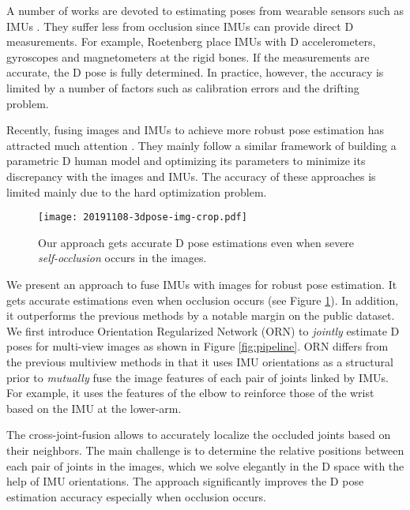 \documentclass[10pt,twocolumn,letterpaper]{article}
\begin{document}
A number of works are devoted to estimating poses from wearable sensors such as IMUs \cite{trumble2017total,roetenberg2009xsens,von2016human,von2017sparse}. They suffer less from occlusion since IMUs can provide direct D measurements. For example, Roetenberg \etal \cite{roetenberg2009xsens} place  IMUs with D accelerometers, gyroscopes and magnetometers at the rigid bones. If the measurements are accurate, the D pose is fully determined. In practice, however, the accuracy is limited by a number of factors such as calibration errors and the drifting problem.

Recently, fusing images and IMUs to achieve more robust pose estimation has attracted much attention \cite{trumble2017total,von2018recovering,gilbert2019fusing,malleson2017real}. They mainly follow a similar framework of building a parametric D human model and optimizing its parameters to minimize its discrepancy with the images and IMUs. The accuracy of these approaches is limited mainly due to the hard optimization problem. 

\begin{figure}
	\centering
	\texttt{[image: 20191108-3dpose-img-crop.pdf]}
	\caption{Our approach gets accurate D pose estimations even when severe \emph{self-occlusion} occurs in the images.}
	\label{fig:sample}
\end{figure}

We present an approach to fuse IMUs with images for robust pose estimation. It gets accurate estimations even when occlusion occurs (see Figure \ref{fig:sample}). In addition, it outperforms the previous methods \cite{malleson2017real, von2018recovering} by a notable margin on the public dataset. 
We first introduce Orientation Regularized Network (ORN) to \emph{jointly} estimate D poses for multi-view images as shown in Figure \ref{fig:pipeline}. ORN differs from the previous multiview methods \cite{qiu2019cross} in that it uses IMU orientations as a structural prior to \emph{mutually} fuse the image features of each pair of joints linked by IMUs. For example, it uses the features of the elbow to reinforce those of the wrist based on the IMU at the lower-arm. 

The cross-joint-fusion allows to accurately localize the occluded joints based on their neighbors. The main challenge is to determine the relative positions between each pair of joints in the images, which we solve elegantly in the D space with the help of IMU orientations. The approach significantly improves the D pose estimation accuracy especially when occlusion occurs. 
\end{document}
